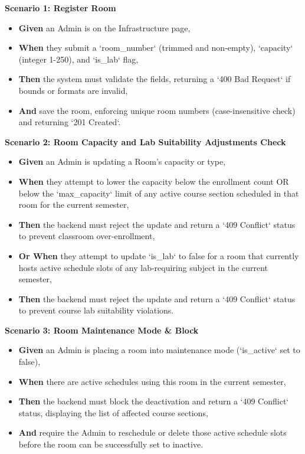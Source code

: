 \noindent\textbf{Scenario 1: Register Room}\\
\begin{itemize}
  \item \textbf{Given} an Admin is on the Infrastructure page,
  \item \textbf{When} they submit a `room\_number` (trimmed and non-empty), `capacity` (integer 1-250), and `is\_lab` flag,
  \item \textbf{Then} the system must validate the fields, returning a `400 Bad Request` if bounds or formats are invalid,
  \item \textbf{And} save the room, enforcing unique room numbers (case-insensitive check) and returning `201 Created`.
\end{itemize}


\noindent\textbf{Scenario 2: Room Capacity and Lab Suitability Adjustments Check}\\
\begin{itemize}
  \item \textbf{Given} an Admin is updating a Room's capacity or type,
  \item \textbf{When} they attempt to lower the capacity below the enrollment count OR below the `max\_capacity` limit of any active course section scheduled in that room for the current semester,
  \item \textbf{Then} the backend must reject the update and return a `409 Conflict` status to prevent classroom over-enrollment,
  \item \textbf{Or When} they attempt to update `is\_lab` to false for a room that currently hosts active schedule slots of any lab-requiring subject in the current semester,
  \item \textbf{Then} the backend must reject the update and return a `409 Conflict` status to prevent course lab suitability violations.
\end{itemize}


\noindent\textbf{Scenario 3: Room Maintenance Mode \& Block}\\
\begin{itemize}
  \item \textbf{Given} an Admin is placing a room into maintenance mode (`is\_active` set to false),
  \item \textbf{When} there are active schedules using this room in the current semester,
  \item \textbf{Then} the backend must block the deactivation and return a `409 Conflict` status, displaying the list of affected course sections,
  \item \textbf{And} require the Admin to reschedule or delete those active schedule slots before the room can be successfully set to inactive.
\end{itemize}

